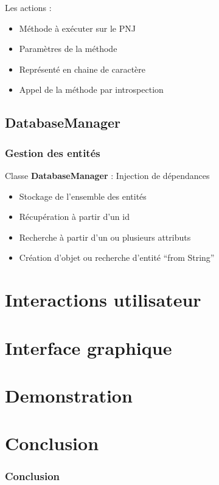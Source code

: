 \documentclass{beamer}
\begin{document}
\begin{frame}
  Les actions :
  \begin{itemize}
  \item Méthode à exécuter sur le PNJ
  \item Paramètres de la méthode
  \item Représenté en chaine de caractère
  \item Appel de la méthode par introspection
  \end{itemize}
\end{frame}

\subsection{DatabaseManager}
\begin{frame}
  \frametitle{Gestion des entités}
  Classe \textbf{DatabaseManager} : Injection de dépendances
  \begin{itemize}
  \item Stockage de l'ensemble des entités
  \item Récupération à partir d'un id
  \item Recherche à partir d'un ou plusieurs attributs
  \item Création d'objet ou recherche d'entité ``from String''
  \end{itemize}
\end{frame}

\section{Interactions utilisateur}
\begin{frame}
  
\end{frame}

\section{Interface graphique}
\begin{frame}
  
\end{frame}

\section{Demonstration}
\begin{frame}
  
\end{frame}


\section{Conclusion}
\begin{frame}
  \frametitle{Conclusion}
\end{frame}
\end{document}
